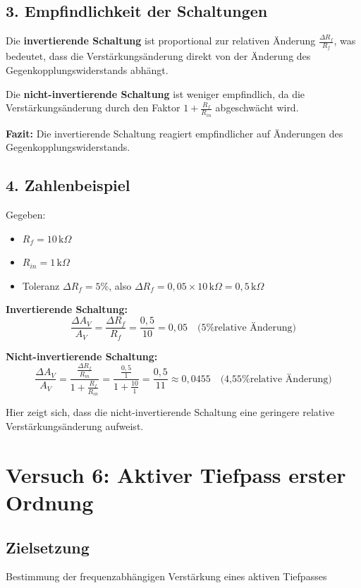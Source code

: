 \documentclass[a4paper,12pt]{article}
\begin{document}
\subsection*{3. Empfindlichkeit der Schaltungen}
Die \textbf{invertierende Schaltung} ist proportional zur relativen Änderung \( \frac{\Delta R_f}{R_f} \), was bedeutet, dass die Verstärkungsänderung direkt von der Änderung des Gegenkopplungswiderstands abhängt.

Die \textbf{nicht-invertierende Schaltung} ist weniger empfindlich, da die Verstärkungsänderung durch den Faktor \( 1 + \frac{R_f}{R_{in}} \) abgeschwächt wird.

\textbf{Fazit:} Die invertierende Schaltung reagiert empfindlicher auf Änderungen des Gegenkopplungswiderstands.

\subsection*{4. Zahlenbeispiel}
Gegeben:
\begin{itemize}
    \item \( R_f = 10 \, \text{k}\Omega \)
    \item \( R_{in} = 1 \, \text{k}\Omega \)
    \item Toleranz \( \Delta R_f = 5\% \), also \( \Delta R_f = 0,05 \times 10 \, \text{k}\Omega = 0,5 \, \text{k}\Omega \)
\end{itemize}

\textbf{Invertierende Schaltung:}
\[
\frac{\Delta A_V}{A_V} = \frac{\Delta R_f}{R_f} = \frac{0,5}{10} = 0,05 \quad \text{(5\% relative Änderung)}
\]

\textbf{Nicht-invertierende Schaltung:}
\[
\frac{\Delta A_V}{A_V} = \frac{\frac{\Delta R_f}{R_{in}}}{1 + \frac{R_f}{R_{in}}} = \frac{\frac{0,5}{1}}{1 + \frac{10}{1}} = \frac{0,5}{11} \approx 0,0455 \quad \text{(4,55\% relative Änderung)}
\]

\noindent Hier zeigt sich, dass die nicht-invertierende Schaltung eine geringere relative Verstärkungsänderung aufweist.


\section{Versuch 6: Aktiver Tiefpass erster Ordnung}
\subsection{Zielsetzung}
Bestimmung der frequenzabhängigen Verstärkung eines aktiven Tiefpasses
\end{document}
